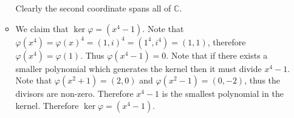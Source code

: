 \documentclass[12pt, letterpaper]{article}
\newcommand{\C}{\mathbb{C}}
\begin{document}
\begin{enumerate}
\begin{itemize}
		Clearly the second coordinate spans all of $\C$.  
		\item We claim that $\ker \varphi = (x^4 - 1)$.  Note that $\varphi(x^4) = \varphi(x)^4 = (1,i)^4 = (1^4,i^4) = (1,1)$, therefore $\varphi(x^4) = \varphi(1)$.
		Thus $\varphi(x^4 - 1) = 0$.  Note that if there exists a smaller polynomial which generates the kernel then it must divide $x^4 - 1$.  Note that 
		$\varphi(x^2+1) = (2,0)$ and $\varphi(x^2 - 1) = (0,-2)$, thus the divisors are non-zero.  Therefore $x^4 - 1$ is the smallest polynomial in the kernel.  Therefore $\ker \varphi = (x^4 - 1)$.  
	\end{itemize}
\end{enumerate}
\end{document}
